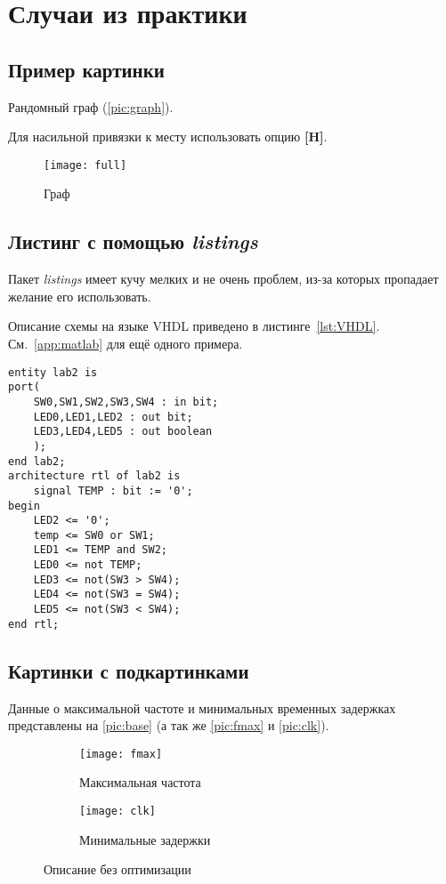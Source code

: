 \section{Случаи из практики}

\subsection{Пример картинки}

Рандомный граф (\vref{pic:graph}). 

Для насильной привязки к месту использовать опцию \textbf{[H]}. \cite{float}

\begin{figure}[H]
	\centering
	\texttt{[image: full]}
	\caption{Граф}
	\label{pic:graph}
\end{figure}

\subsection{Листинг с помощью \emph{listings}}

Пакет \emph{listings} имеет кучу мелких и не очень проблем, из-за которых пропадает желание его использовать.

Описание схемы на языке VHDL приведено в листинге~\ref{lst:VHDL}.
См.~\vref{app:matlab} для ещё одного примера.

\lstset{style=vhdl}
\begin{lstlisting}[label=lst:VHDL,caption=Описание схемы]
entity lab2 is
port(
	SW0,SW1,SW2,SW3,SW4 : in bit;
	LED0,LED1,LED2 : out bit;
	LED3,LED4,LED5 : out boolean
	);
end lab2;
architecture rtl of lab2 is
	signal TEMP : bit := '0';
begin
	LED2 <= '0';
	temp <= SW0 or SW1;
	LED1 <= TEMP and SW2;
	LED0 <= not TEMP;
	LED3 <= not(SW3 > SW4);
	LED4 <= not(SW3 = SW4);
	LED5 <= not(SW3 < SW4);
end rtl;
\end{lstlisting}

\subsection{Картинки с подкартинками}

Данные о максимальной частоте и минимальных временных задержках представлены на \vref{pic:base} (а так же \vref{pic:fmax} и \vref{pic:clk}). \cite{subcap}

\begin{figure}[H]
	\begin{subfigure}{.4\linewidth}
		\centering
		\texttt{[image: fmax]}
		\caption{Максимальная частота}
		\label{pic:fmax}
	\end{subfigure}
	\begin{subfigure}{.6\linewidth}
		\centering
		\texttt{[image: clk]}
		\caption{Минимальные задержки}
		\label{pic:clk}
	\end{subfigure}
\caption{Описание без оптимизации}
\label{pic:base}
\end{figure}

